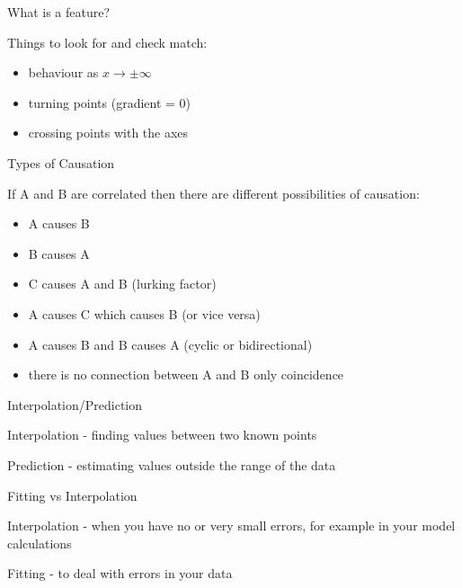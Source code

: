 \documentclass{beamer}
\begin{document}
\begin{frame}{What is a feature?}


Things to look for and check match:
\begin{itemize}
\item behaviour as $x \rightarrow \pm \infty$
\item turning points (gradient = 0)
\item crossing points with the axes
\end{itemize}

\end{frame}


\begin{frame}{Types of Causation}

If A and B are correlated then there are different possibilities of causation:
\begin{itemize}
\item A causes B
\item B causes A
\item C causes A and B (lurking factor)
\item A causes C which causes B (or vice versa)
\item A causes B and B causes A (cyclic or bidirectional)
\item there is no connection between A and B only coincidence
\end{itemize}


\end{frame}





\begin{frame}{Interpolation/Prediction}

Interpolation - finding values between two known points

\vspace{5mm}

Prediction - estimating values outside the range of the data

\end{frame}



\begin{frame}{Fitting vs Interpolation}

Interpolation - when you have no or very small errors, for example in your model calculations

\vspace{5mm}

Fitting - to deal with errors in your data

\end{frame}
\end{document}
